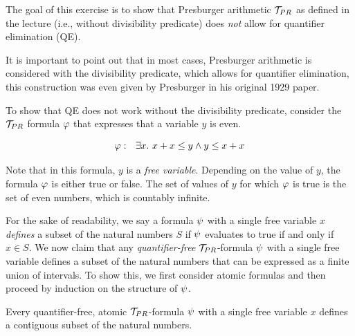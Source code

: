 The goal of this exercise is to show that Presburger arithmetic $\mathcal{T}_{PR}$
as defined in the lecture (i.e., without divisibility predicate) does \emph{not}
allow for quantifier elimination (QE).

It is important to point out that in most cases, Presburger arithmetic is
considered with the divisibility predicate, which allows for quantifier
elimination, this construction was even given by Presburger in his original 1929 paper.

To show that QE does not work without the divisibility predicate, consider the
$\mathcal{T}_{PR}$ formula $\varphi$ that expresses that a variable $y$ is even.

\[
\varphi:~~\exists x.~x + x \leq y \land y \leq x + x
\]

Note that in this formula, $y$ is a \emph{free variable}. Depending on the
value of $y$, the formula $\varphi$ is either true or false. The set of
values of $y$ for which $\varphi$ is true is the set of even numbers, which
is countably infinite.

For the sake of readability, we say a formula $\psi$ with a single free variable $x$ \emph{defines} a subset
of the natural numbers $S$ if $\psi$ evaluates to true if and only if $x \in S$.
We now claim that any \emph{quantifier-free} $\mathcal{T}_{PR}$-formula $\psi$ with a single free variable
defines a subset of the natural numbers that can be expressed as
a finite union of intervals. To show this, we first consider atomic formulas
and then proceed by induction on the structure of $\psi$.

\begin{lemma}
  \label{lem:atomic}
  Every quantifier-free, atomic $\mathcal{T}_{PR}$-formula $\psi$ with a single free variable $x$
  defines a contiguous subset of the natural numbers.
\end{lemma}

